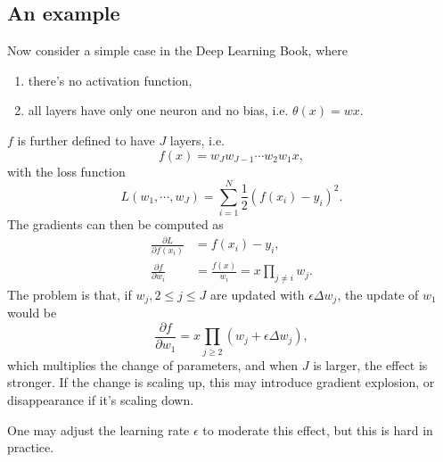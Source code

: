 \subsection{An example}
Now consider a simple case in the Deep Learning Book, where
\begin{enumerate}
\item there's no activation function,
\item all layers have only one neuron and no bias, i.e. $\theta(x) = wx$.
\end{enumerate}
$f$ is further defined to have $J$ layers, i.e.
\begin{equation}
	f(x) = w_J w_{J-1} \cdots w_2 w_1 x,
\end{equation}
with the loss function
\begin{equation}
	L(w_1, \cdots, w_J) = \sum_{i = 1}^N\frac{1}{2} (f(x_i) - y_i)^2.
\end{equation}
The gradients can then be computed as
\begin{align}
	\frac{\partial L}{\partial f(x_i)}&=f(x_i)-y_i,\\
	\frac{\partial f}{\partial w_i}&=\frac{f(x)}{w_i}=x\prod_{j\neq i}w_j.
\end{align}
The problem is that, if $w_j,2\leq j\leq J$ are updated with $\epsilon\Delta w_j$, the update of $w_1$ would be 
\begin{equation}
	\frac{\partial f}{\partial w_1}=x\prod_{j\geq2}(w_j+\epsilon\Delta w_j),
\end{equation}
which multiplies the change of parameters, and when $J$ is larger, the effect is stronger. If the change is scaling up, this may introduce gradient explosion, or disappearance if it's scaling down.

One may adjust the learning rate $\epsilon$ to moderate this effect, but this is hard in practice.

%

